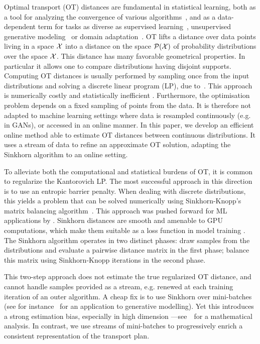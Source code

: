 
Optimal transport (OT) distances are fundamental in statistical learning, both
as a tool for analyzing the convergence of various
algorithms~\citep{canas2012learning,dalalyan2019user}, and as a data-dependent
term for tasks as diverse as supervised learning~\citep{frogner2015learning},
unsupervised generative modeling~\citep{arjovsky2017wgan} or domain
adaptation~\citep{courty2016optimal}.
%
OT lifts a distance over data points living in a space $\mathcal{X}$ into a distance
on the space $\mathcal{P}(\mathcal{X})$ of probability distributions over the space $\mathcal{X}$.
% 
%
This distance has many favorable geometrical properties. In particular it allows one to compare distributions having disjoint supports. 
% 
Computing OT distances is usually performed by sampling once from the input
distributions and solving a discrete linear program (LP), due
to~\citet{Kantorovich42}. This approach is numerically costly and statistically
inefficient \citep{weed2019sharp}. Furthermore, the optimisation problem depends on a fixed
sampling of points from the data. It is therefore not adapted to machine
learning settings where data is resampled continuously (e.g. in GANs), or
accessed in an online manner. In this paper, we develop an efficient
online method able to estimate OT distances between continuous distributions. It uses 
a stream of data to refine an approximate OT solution,
adapting the Sinkhorn algorithm to an online setting.
  


To alleviate both the computational and statistical burdens of OT, it is common
to regularize the Kantorovich LP.
%
The most successful approach in this direction is to use an entropic barrier penalty. 
%
When dealing with discrete distributions, this yields a problem that can be solved
numerically using Sinkhorn-Knopp's matrix balancing
algorithm~\citep{Sinkhorn64,sinkhorn1967concerning}.
%
This approach was pushed forward for ML applications by
\citet{cuturi2013sinkhorn}. Sinkhorn distances are smooth and amenable to GPU
computations, which make them suitable as a loss function in model training \citep{frogner2015learning, mensch_geometric_2019}.
The Sinkhorn algorithm operates in two distinct phases: draw samples from the
distributions and evaluate a pairwise distance matrix in the first phase;
balance this matrix using Sinkhorn-Knopp iterations in the second
phase.

This two-step approach does not estimate the true regularized OT
distance, and cannot handle samples provided as a stream, e.g. renewed at each
training iteration of an outer algorithm. A cheap fix is to use Sinkhorn over
mini-batches (see for instance~\citet{2018-Genevay-aistats} for an application
to generative modelling). Yet this introduces a strong estimation bias, especially in high
dimension ---see~\citet{fatras2019learning} for a mathematical analysis. In
contrast, we use streams of mini-batches to progressively enrich a consistent representation of the
transport plan.

